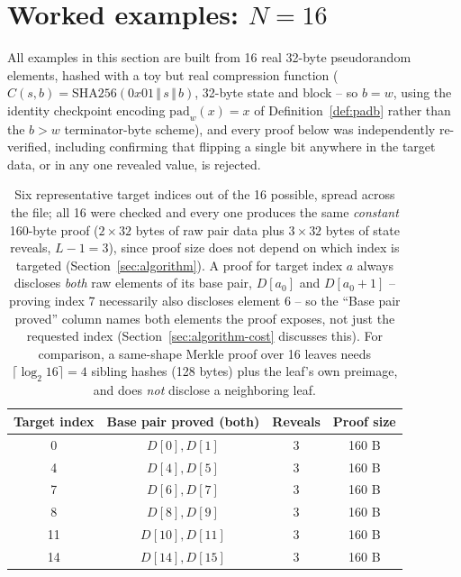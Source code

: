 \section{Worked examples: $N=16$}
\label{sec:examples}

All examples in this section are built from 16 real 32-byte pseudorandom
elements, hashed with a toy but real compression function ($C(s,b) =
\mathrm{SHA256}(0x01 \,\Vert\, s \,\Vert\, b)$, 32-byte state and block --
so $b=w$, using the identity checkpoint encoding $\mathrm{pad}_w(x)=x$ of
Definition~\ref{def:padb} rather than the $b>w$ terminator-byte scheme),
and every proof below was independently re-verified, including confirming
that flipping a single bit anywhere in the target data, or in any one
revealed value, is rejected.

\begin{table}[htbp]
\centering
\begin{tabular}{@{}cccc@{}}
\toprule
Target index & Base pair proved (both) & Reveals & Proof size \\
\midrule
0  & $D[0],D[1]$   & 3 & 160 B \\
4  & $D[4],D[5]$   & 3 & 160 B \\
7  & $D[6],D[7]$   & 3 & 160 B \\
8  & $D[8],D[9]$   & 3 & 160 B \\
11 & $D[10],D[11]$ & 3 & 160 B \\
14 & $D[14],D[15]$ & 3 & 160 B \\
\bottomrule
\end{tabular}
\caption{Six representative target indices out of the 16 possible, spread
across the file; all 16 were checked and every one produces the same
\emph{constant} 160-byte proof ($2 \times 32$ bytes of raw pair data plus
$3 \times 32$ bytes of state reveals, $L-1=3$), since proof size does not
depend on which index is targeted (Section~\ref{sec:algorithm}). A proof
for target index $a$ always discloses \emph{both} raw elements of its base
pair, $D[a_0]$ and $D[a_0{+}1]$ -- proving index 7 necessarily also
discloses element 6 -- so the ``Base pair proved'' column names both
elements the proof exposes, not just the requested index (Section~\ref{sec:algorithm-cost}
discusses this). For comparison, a same-shape Merkle proof over 16 leaves
needs $\lceil \log_2 16 \rceil = 4$ sibling hashes (128 bytes) plus the
leaf's own preimage, and does \emph{not} disclose a neighboring leaf.}
\label{tab:examples-n16}
\end{table}

